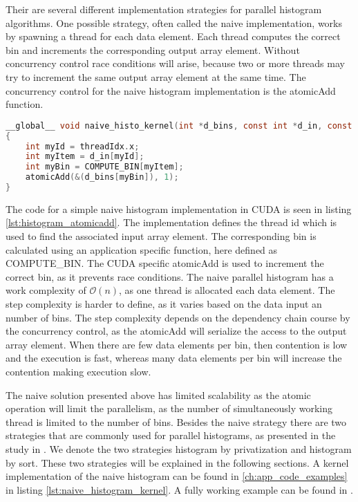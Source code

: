 Their are several different implementation strategies for parallel histogram algorithms. One possible strategy, often called the naive implementation, works by spawning a thread for each data element. Each thread computes the correct bin and increments the corresponding output array element. Without concurrency control race conditions will arise, because two or more threads may try to increment the same output array element at the same time. The concurrency control for the naive histogram implementation is the atomicAdd function.

\begin{lstlisting}[language=C,caption={Pseudo code for naive implementation of histogram using atomics},label=lst:histogram_atomicadd]
__global__ void naive_histo_kernel(int *d_bins, const int *d_in, const int BIN_COUNT)
{
	int myId = threadIdx.x;
	int myItem = d_in[myId];
	int myBin = COMPUTE_BIN[myItem];
	atomicAdd(&(d_bins[myBin]), 1);
}
\end{lstlisting}

The code for a simple naive histogram implementation in CUDA is seen in listing \ref{lst:histogram_atomicadd}. The implementation defines the thread id which is used to find the associated input array element. The corresponding bin is calculated using an application specific function, here defined as COMPUTE\_BIN. The CUDA specific atomicAdd is used to increment the correct bin, as it prevents race conditions. The naive parallel histogram has a work complexity of $\mathcal{O}(n)$, as one thread is allocated each data element. The step complexity is harder to define, as it varies based on the data input an number of bins. The step complexity depends on the dependency chain course by the concurrency control, as the atomicAdd will serialize the access to the output array element. When there are few data elements per bin, then contention is low and the execution is fast, whereas many data elements per bin will increase the contention making execution slow. 

The naive solution presented above has limited scalability as the atomic operation will limit the parallelism, as the number of simultaneously working thread is limited to the number of bins. Besides the naive strategy there are two strategies that are commonly used for parallel histograms, as presented in the study in \cite{MilicHistogram}. We denote the two strategies histogram by privatization and histogram by sort. These two strategies will be explained in the following sections. A kernel implementation of the naive histogram can be found in \cref{ch:app_code_examples} in listing \ref{lst:naive_histogram_kernel}. A fully working example can be found in \cite{exercises}.